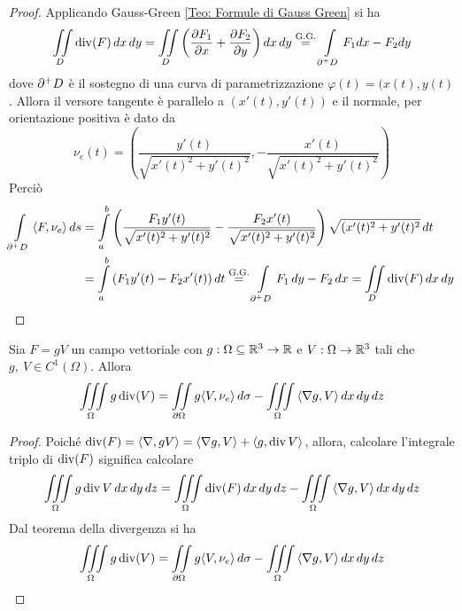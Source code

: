  \begin{proof}
     Applicando Gauss-Green \eqref{Teo: Formule di Gauss Green} si ha
     \begin{equation}
     \iint\limits_{D}{\operatorname{div}(F)}\,dx\,dy=\iint\limits_{D}{\left(\frac{\partial F_1}{\partial x}+ \frac{\partial F_2}{\partial y}\right)}\,dx\,dy \overset{\text{G.G.}}{=} \int\limits_{\partial^+ D}{F_1 dx - F_2 dy}
     \end{equation}
     dove $\partial^+ D$ è il sostegno di una curva di parametrizzazione $\varphi(t)= (x(t), y(t)$. Allora il versore tangente è parallelo a $(x'(t), y'(t))$ e il normale, per orientazione positiva è dato da 
     \begin{equation}
         \nu_e(t)=\left(\frac{y'(t)}{\sqrt{x'(t)^2+y'(t)^2}}, -\frac{x'(t)}{\sqrt{x'(t)^2+y'(t)^2}} \right)
     \end{equation}
     Perciò
     \begin{equation}
         \begin{aligned}
             \int\limits_{\partial^+ D}{\langle F, \nu_e \rangle}\,ds &= \int\limits_{a}^{b}{\left(\frac{F_1y'(t)}{\sqrt{x'(t)^2+y'(t)^2}} -\frac{F_2x'(t)}{\sqrt{x'(t)^2+y'(t)^2}} \right)\sqrt{(x'(t)^2+y'(t)^2}}\, dt\\
             &=\int\limits_{a}^{b}{(F_1 y'(t)- F_2 x'(t))}\, dt \overset{\text{G.G.}}{=} \int\limits_{\partial^+ D}{F_1\,dy- F_2\,dx} = \iint\limits_{D}{\operatorname{div}(F)}\,dx\,dy
         \end{aligned}
     \end{equation}
\end{proof}
\begin{corollary}
    Sia $F= gV$ un campo vettoriale con $g:\Omega \subseteq \mathbb{R}^3\to \mathbb{R}$ e $V: \Omega \to \mathbb{R}^3$ tali che $g,\ V \in C^1(\Omega)$. Allora 
    \begin{equation}
    \iiint\limits_{\Omega}{g \operatorname{div}(V)}= \iint\limits_{\partial \Omega}{g \langle V, \nu_e \rangle}\, d\sigma - \iiint\limits_{\Omega}{\langle \nabla g, V \rangle}\,dx\,dy\,dz
    \end{equation}
\end{corollary}
\begin{proof}
Poiché $\operatorname{div}(F)= \langle \nabla, gV \rangle = \langle \nabla g, V \rangle + \langle g, \operatorname{div} V \rangle$, allora, calcolare l'integrale triplo di $\operatorname{div}(F)$ significa calcolare
    \begin{equation}
      \iiint\limits_\Omega{g \operatorname{div}V}\,dx\,dy\,dz = \iiint\limits_{\Omega} {\operatorname{div}(F)}\,dx\,dy\,dz - \iiint\limits_{\Omega} {\langle \nabla g, V \rangle}\,dx\,dy\,dz
    \end{equation}
    Dal teorema della divergenza si ha 
    \begin{equation}
    \iiint\limits_{\Omega}{g \operatorname{div}(V)}= \iint\limits_{\partial \Omega}{g \langle V, \nu_e \rangle}\, d\sigma - \iiint\limits_{\Omega}{\langle \nabla g, V \rangle}\,dx\,dy\,dz
    \end{equation}
\end{proof}